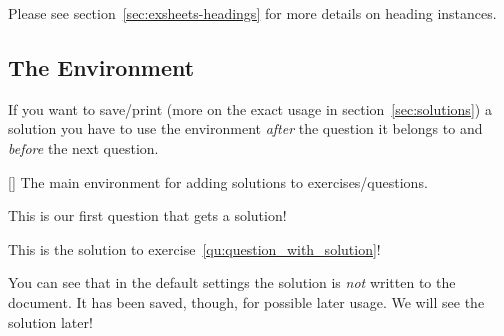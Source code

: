 \documentclass[load-preamble+,scrartcl={DIV10}]{cnltx-doc}
\begin{document}
Please see section~\ref{sec:exsheets-headings} for more details on heading
instances.

\subsection{The  Environment}
If you want to save/print (more on the exact usage in
section~\ref{sec:solutions}) a solution you have to use the 
environment \emph{after} the question it belongs to and \emph{before} the next
question.
\begin{environments}
  []
    The main environment for adding solutions to exercises/questions.
\end{environments}
\begin{example}
  \begin{question}[ID=first]\label{qu:question_with_solution}
    This is our first question that gets a solution!
  \end{question}
  \begin{solution}
    This is the solution to exercise~\ref{qu:question_with_solution}!
  \end{solution}
\end{example}
You can see that in the default settings the solution is \emph{not} written to
the document.  It has been saved, though, for possible later usage.  We will
see the solution later!
\end{document}
